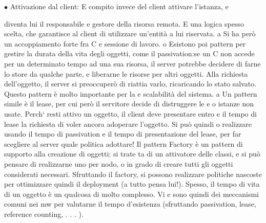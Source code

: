 \documentclass[a4paper,12pt]{article}
\begin{document}
$\bullet$ Attivazione dal client: E compito invece del client attivare l'istanza, e

diventa lui il responsabile e gestore della risorsa remota. E una logica
spesso scelta, che garantisce al client di utilizzare un'entità a lui riservata.
a
Si ha però un accoppiamento forte fra C e sessione di lavoro.
o
Esistono poi pattern per gestire la durata della vita degli oggetti, come il passivation:se un C non accede per un
determinato tempo ad una sua risorsa, il
server potrebbe decidere di farne lo store da qualche parte, e liberarne le risorse
per altri oggetti. Alla richiesta dell'oggetto, il server si preoccuperò di riattia
varlo, ricaricando lo stato salvato. Questo pattern è molto importante per la
e
scalabilità del sistema.
a
Un pattern simile è il lease, per cui però il servitore decide di distruggere le
e
o
istanze non usate. Perch` resti attivo un oggetto, il client deve presentare entro
e
il tempo di lease la richiesta di voler ancora adoperare l'oggetto. Si può quindi
o
realizzare usando il tempo di passivation e il tempo di presentazione del lease,
per far scegliere al server quale politica adottare!
Il pattern Factory è un pattern di supporto alla creazione di oggetti: si trate
ta di un attivatore delle classi, e si può pensare di realizzarne uno per nodo,
o
in grado di creare tutti gli oggetti considerati necessari. Sfruttando il factory,
si possono realizzare politiche nascoste per ottimizzare quindi il deployment (a
tutto pensa lui!).
Spesso, il tempo di vita di un oggetto è un qualcosa di molto complesso. Vi
e
sono quindi dei meccanismi comuni nei mw per valutarne il tempo d'esistenza
(sfruttando passivation, lease, reference counting, . . . ).
\end{document}
